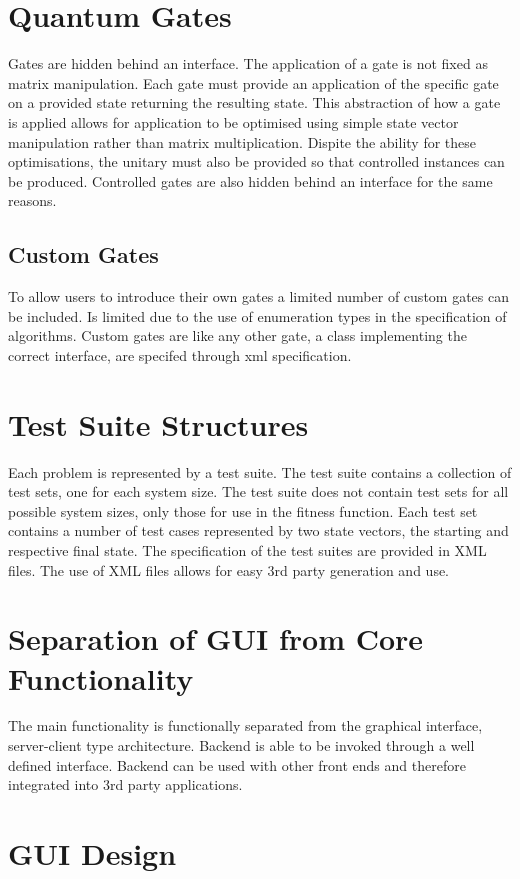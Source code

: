 \documentclass[authoryearcitations]{UoYCSproject}
\begin{document}
\section{Quantum Gates}
Gates are hidden behind an interface.
The application of a gate is not fixed as matrix manipulation.
Each gate must provide an application of the specific gate on a provided state returning the resulting state.
This abstraction of how a gate is applied allows for application to be optimised using simple state vector manipulation rather than matrix multiplication.
Dispite the ability for these optimisations, the unitary must also be provided so that controlled instances can be produced.
Controlled gates are also hidden behind an interface for the same reasons.

\subsection{Custom Gates}
To allow users to introduce their own gates a limited number of custom gates can be included.
Is limited due to the use of enumeration types in the specification of algorithms.
Custom gates are like any other gate, a class implementing the correct interface, are specifed through xml specification.

\section{Test Suite Structures}
Each problem is represented by a test suite.
The test suite contains a collection of test sets, one for each system size.
The test suite does not contain test sets for all possible system sizes, only those for use in the fitness function.
Each test set contains a number of test cases represented by two state vectors, the starting and respective final state.
The specification of the test suites are provided in XML files.
The use of XML files allows for easy 3rd party generation and use.

\section{Separation of GUI from Core Functionality}
The main functionality is functionally separated from the graphical interface, server-client type architecture.
Backend is able to be invoked through a well defined interface.
Backend can be used with other front ends and therefore integrated into 3rd party applications.

\section{GUI Design}
\end{document}
